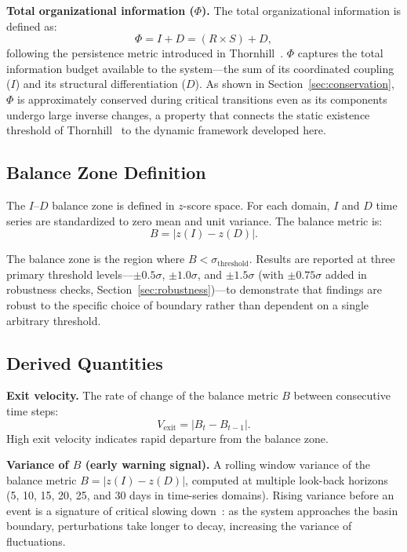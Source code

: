 \documentclass[12pt,a4paper]{article}
\begin{document}
\textbf{Total organizational information ($\Phi$).} The total organizational information is defined as:
\begin{equation}
\Phi = I + D = (R \times S) + D,
\end{equation}
following the persistence metric introduced in Thornhill~\cite{thornhill2026a}. $\Phi$ captures the total information budget available to the system---the sum of its coordinated coupling ($I$) and its structural differentiation ($D$). As shown in Section~\ref{sec:conservation}, $\Phi$ is approximately conserved during critical transitions even as its components undergo large inverse changes, a property that connects the static existence threshold of Thornhill~\cite{thornhill2026a,thornhill2026b,thornhill2026c} to the dynamic framework developed here.

\subsection{Balance Zone Definition}

The $I$--$D$ balance zone is defined in $z$-score space. For each domain, $I$ and $D$ time series are standardized to zero mean and unit variance. The balance metric is:
\begin{equation}
B = |z(I) - z(D)|.
\end{equation}

The balance zone is the region where $B < \sigma_{\text{threshold}}$. Results are reported at three primary threshold levels---$\pm 0.5\sigma$, $\pm 1.0\sigma$, and $\pm 1.5\sigma$ (with $\pm 0.75\sigma$ added in robustness checks, Section~\ref{sec:robustness})---to demonstrate that findings are robust to the specific choice of boundary rather than dependent on a single arbitrary threshold.

\subsection{Derived Quantities}

\textbf{Exit velocity.} The rate of change of the balance metric $B$ between consecutive time steps:
\begin{equation}
V_{\text{exit}} = |B_t - B_{t-1}|.
\end{equation}
High exit velocity indicates rapid departure from the balance zone.

\textbf{Variance of $B$ (early warning signal).} A rolling window variance of the balance metric $B = |z(I) - z(D)|$, computed at multiple look-back horizons (5, 10, 15, 20, 25, and 30 days in time-series domains). Rising variance before an event is a signature of critical slowing down~\cite{scheffer2009,dakos2012}: as the system approaches the basin boundary, perturbations take longer to decay, increasing the variance of fluctuations.
\end{document}
